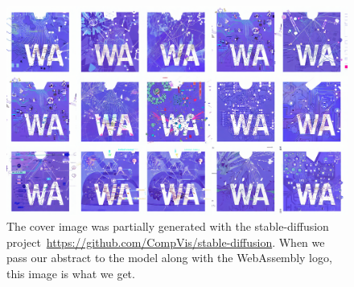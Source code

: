 
{
    \thispagestyle{empty}
    \centering
    \renewcommand\thefigure{for thesis cover}    
    \begin{figure}
        \includegraphics[width=1.2\textwidth]{cover/final.png}
        \caption{The cover image was partially generated with the stable-diffusion project\ \url{https://github.com/CompVis/stable-diffusion}. When we pass our abstract to the model along with the WebAssembly logo, this image is what we get.
        }
    \end{figure}
}